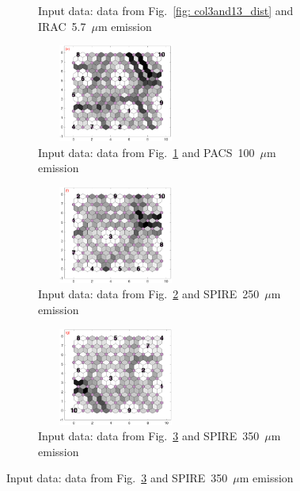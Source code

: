 \begin{figure}
\begin{subfigure}[b]{0.25\textwidth}
        \captionsetup{font=tiny}
        \caption{Input data: data from Fig.~\ref{fig: col3and13_dist} and IRAC~5.7~$\mu$m emission} 
        \label{fig: col3and14_dist}
    \end{subfigure}
        \hfill
    \begin{subfigure}[b]{0.25\textwidth}
        \centering
        \includegraphics[width=52mm, height=32mm]{../../images0.01/M31/2D/diff_dimension/combine_2D_data_between_cols3and15.png}
        \captionsetup{font=tiny}
        \caption{Input data: data from Fig.~\ref{fig: col3and14_dist} and PACS~100~$\mu$m emission} 
        \label{fig: col3and15_dist}
    \end{subfigure}
        \hfill
    \begin{subfigure}[b]{0.25\textwidth}
        \centering
        \includegraphics[width=52mm, height=32mm]{../../images0.01/M31/2D/diff_dimension/combine_2D_data_between_cols3and16.png}
        \captionsetup{font=tiny}
        \caption{Input data: data from Fig.~\ref{fig: col3and15_dist} and SPIRE~250~$\mu$m emission} 
        \label{fig: col3and16_dist}
    \end{subfigure}
        \hfill
    \begin{subfigure}[b]{0.25\textwidth}
        \centering
        \includegraphics[width=52mm, height=32mm]{../../images0.01/M31/2D/diff_dimension/combine_2D_data_between_cols3and17.png}
        \captionsetup{font=tiny}
        \caption{Input data: data from Fig.~\ref{fig: col3and16_dist} and SPIRE~350~$\mu$m emission} 

\end{subfigure}
\end{figure}
